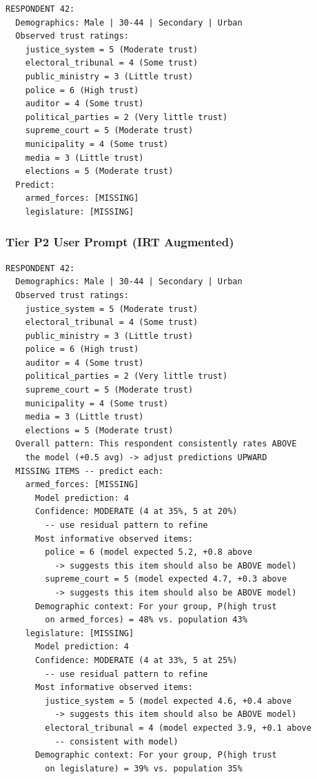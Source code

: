 \documentclass[
  man,
  floatsintext,
  longtable,
  nolmodern,
  notxfonts,
  notimes,
  colorlinks=true,linkcolor=blue,citecolor=blue,urlcolor=blue]{apa7}
\begin{document}
\begin{verbatim}
RESPONDENT 42:
  Demographics: Male | 30-44 | Secondary | Urban
  Observed trust ratings:
    justice_system = 5 (Moderate trust)
    electoral_tribunal = 4 (Some trust)
    public_ministry = 3 (Little trust)
    police = 6 (High trust)
    auditor = 4 (Some trust)
    political_parties = 2 (Very little trust)
    supreme_court = 5 (Moderate trust)
    municipality = 4 (Some trust)
    media = 3 (Little trust)
    elections = 5 (Moderate trust)
  Predict:
    armed_forces: [MISSING]
    legislature: [MISSING]
\end{verbatim}

\subsubsection{Tier P2 User Prompt (IRT
Augmented)}\label{tier-p2-user-prompt-irt-augmented}

\begin{verbatim}
RESPONDENT 42:
  Demographics: Male | 30-44 | Secondary | Urban
  Observed trust ratings:
    justice_system = 5 (Moderate trust)
    electoral_tribunal = 4 (Some trust)
    public_ministry = 3 (Little trust)
    police = 6 (High trust)
    auditor = 4 (Some trust)
    political_parties = 2 (Very little trust)
    supreme_court = 5 (Moderate trust)
    municipality = 4 (Some trust)
    media = 3 (Little trust)
    elections = 5 (Moderate trust)
  Overall pattern: This respondent consistently rates ABOVE
    the model (+0.5 avg) -> adjust predictions UPWARD
  MISSING ITEMS -- predict each:
    armed_forces: [MISSING]
      Model prediction: 4
      Confidence: MODERATE (4 at 35%, 5 at 20%)
        -- use residual pattern to refine
      Most informative observed items:
        police = 6 (model expected 5.2, +0.8 above
          -> suggests this item should also be ABOVE model)
        supreme_court = 5 (model expected 4.7, +0.3 above
          -> suggests this item should also be ABOVE model)
      Demographic context: For your group, P(high trust
        on armed_forces) = 48% vs. population 43%
    legislature: [MISSING]
      Model prediction: 4
      Confidence: MODERATE (4 at 33%, 5 at 25%)
        -- use residual pattern to refine
      Most informative observed items:
        justice_system = 5 (model expected 4.6, +0.4 above
          -> suggests this item should also be ABOVE model)
        electoral_tribunal = 4 (model expected 3.9, +0.1 above
          -- consistent with model)
      Demographic context: For your group, P(high trust
        on legislature) = 39% vs. population 35%
\end{verbatim}
\end{document}
